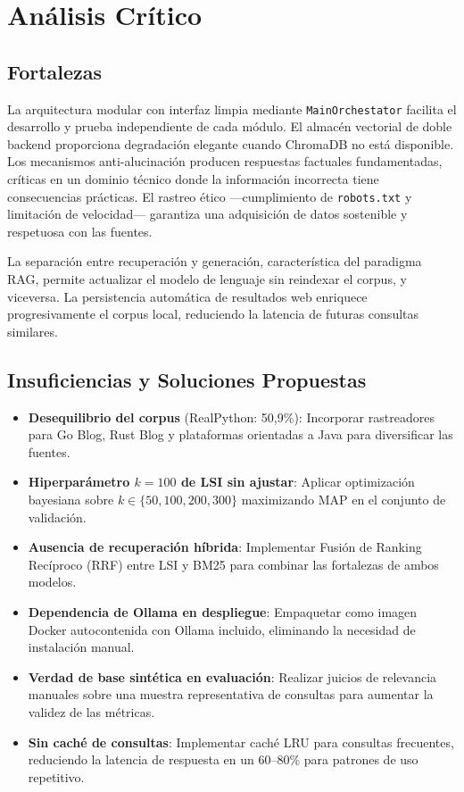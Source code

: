 \documentclass[runningheads,a4paper]{llncs}
\begin{document}
\section{Análisis Crítico}

\subsection{Fortalezas}

La arquitectura modular con interfaz limpia mediante \texttt{MainOrchestator} facilita el desarrollo y prueba independiente de cada módulo. El almacén vectorial de doble backend proporciona degradación elegante cuando ChromaDB no está disponible. Los mecanismos anti-alucinación producen respuestas factuales fundamentadas, críticas en un dominio técnico donde la información incorrecta tiene consecuencias prácticas. El rastreo ético —cumplimiento de \texttt{robots.txt} y limitación de velocidad— garantiza una adquisición de datos sostenible y respetuosa con las fuentes.

La separación entre recuperación y generación, característica del paradigma RAG, permite actualizar el modelo de lenguaje sin reindexar el corpus, y viceversa. La persistencia automática de resultados web enriquece progresivamente el corpus local, reduciendo la latencia de futuras consultas similares.

\subsection{Insuficiencias y Soluciones Propuestas}

\begin{itemize}
\item \textbf{Desequilibrio del corpus} (RealPython: 50,9\%): Incorporar rastreadores para Go Blog, Rust Blog y plataformas orientadas a Java para diversificar las fuentes.
\item \textbf{Hiperparámetro $k=100$ de LSI sin ajustar}: Aplicar optimización bayesiana sobre $k \in \{50, 100, 200, 300\}$ maximizando MAP en el conjunto de validación.
\item \textbf{Ausencia de recuperación híbrida}: Implementar Fusión de Ranking Recíproco (RRF) entre LSI y BM25 para combinar las fortalezas de ambos modelos.
\item \textbf{Dependencia de Ollama en despliegue}: Empaquetar como imagen Docker autocontenida con Ollama incluido, eliminando la necesidad de instalación manual.
\item \textbf{Verdad de base sintética en evaluación}: Realizar juicios de relevancia manuales sobre una muestra representativa de consultas para aumentar la validez de las métricas.
\item \textbf{Sin caché de consultas}: Implementar caché LRU para consultas frecuentes, reduciendo la latencia de respuesta en un 60--80\% para patrones de uso repetitivo.
\end{itemize}
\end{document}
